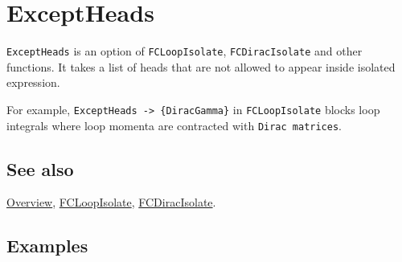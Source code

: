 \documentclass[../FeynCalcManual.tex]{subfiles}
\begin{document}
\hypertarget{exceptheads}{%
\section{ExceptHeads}\label{exceptheads}}

\texttt{ExceptHeads} is an option of \texttt{FCLoopIsolate},
\texttt{FCDiracIsolate} and other functions. It takes a list of heads
that are not allowed to appear inside isolated expression.

For example, \texttt{ExceptHeads -> \{\allowbreak{}DiracGamma\}} in
\texttt{FCLoopIsolate} blocks loop integrals where loop momenta are
contracted with \texttt{Dirac matrices}.

\subsection{See also}

\hyperlink{toc}{Overview}, \hyperlink{fcloopisolate}{FCLoopIsolate},
\hyperlink{fcdiracisolate}{FCDiracIsolate}.

\subsection{Examples}
\end{document}
